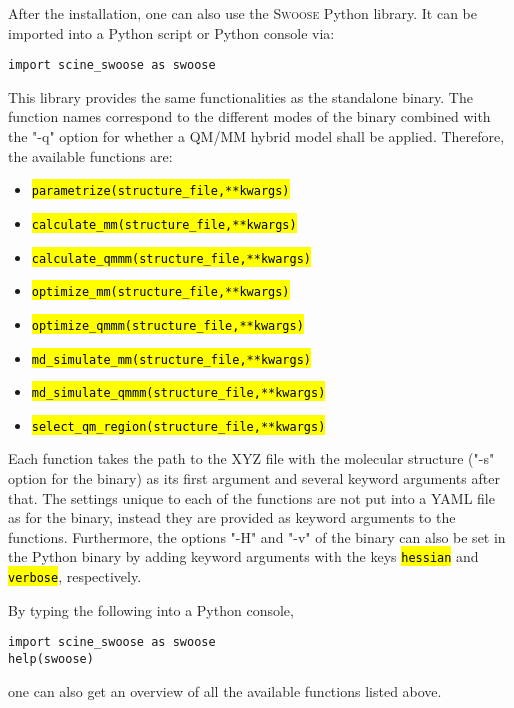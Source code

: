\documentclass[]{tufte-book}
\begin{document}
After the installation, one can also use the \textsc{Swoose} Python library. It can be imported into
a Python script or Python console via:
\begin{mdframed}[backgroundcolor=LightSteelBlue!25, linewidth=0pt]
\begin{verbatim}
import scine_swoose as swoose
\end{verbatim}
\end{mdframed}
This library provides the same functionalities as the standalone binary. The function names correspond to the different modes of the binary combined with the "-q" option for whether a QM/MM hybrid model shall be applied. Therefore, the available functions are:
\begin{itemize}
\item \hl{\texttt{parametrize\:(structure\_file,\:**kwargs)}}
\item \hl{\texttt{calculate\_mm\:(structure\_file,\:**kwargs)}}
\item \hl{\texttt{calculate\_qmmm\:(structure\_file,\:**kwargs)}}
\item \hl{\texttt{optimize\_mm\:(structure\_file,\:**kwargs)}}
\item \hl{\texttt{optimize\_qmmm\:(structure\_file,\:**kwargs)}}
\item \hl{\texttt{md\_simulate\_mm\:(structure\_file,\:**kwargs)}}
\item \hl{\texttt{md\_simulate\_qmmm\:(structure\_file,\:**kwargs)}}
\item \hl{\texttt{select\_qm\_region\:(structure\_file,\:**kwargs)}}
\end{itemize}

Each function takes the path to the XYZ file with the molecular structure ("-s" option for the binary) as its first argument and several keyword arguments after that. The settings unique to each of the functions are not put into a YAML file as for the binary, instead they are provided as keyword arguments to the functions. Furthermore, the options "-H" and "-v" of the binary can also be set in the Python binary by adding keyword arguments with the keys \hl{\texttt{hessian}} and \hl{\texttt{verbose}}, respectively.

By typing the following into a Python console,
\begin{mdframed}[backgroundcolor=LightSteelBlue!25, linewidth=0pt]
\begin{verbatim}
import scine_swoose as swoose
help(swoose)
\end{verbatim}
\end{mdframed}
one can also get an overview of all the available functions listed above.
\end{document}
